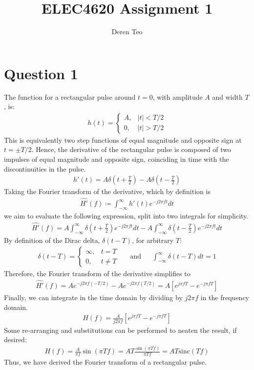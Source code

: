 \documentclass[a4paper, 11pt]{article}
\title{ELEC4620 Assignment 1}
\author{Deren Teo}
\begin{document}
\maketitle

\section*{Question 1}

The function for a rectangular pulse around $t=0$, with amplitude $A$ and width
$T$, is:
\begin{align*}
    h(t) = \begin{cases}
        A, & |t| < T/2 \\
        0, & |t| > T/2
    \end{cases}
\end{align*}
This is equivalently two step functions of equal magnitude and opposite sign at
$t=\pm T/2$. Hence, the derivative of the rectangular pulse is composed of two
impulses of equal magnitude and opposite sign, coinciding in time with the
discontinuities in the pulse.
\begin{align*}
    h'(t) = A \delta(t+\frac{T}{2}) - A \delta(t-\frac{T}{2})
\end{align*}
Taking the Fourier transform of the derivative, which by definition is
\begin{align*}
    \widehat{H'}(f) \coloneqq \int_{-\infty}^{\infty} h'(t) e^{-j2\pi ft} dt
\end{align*}
we aim to evaluate the following expression, split into two integrals for
simplicity.
\begin{align*}
    \widehat{H'}(f) = A \int_{-\infty}^{\infty} \delta(t + \frac{T}{2}) e^{-j2\pi ft} dt -
            A \int_{-\infty}^{\infty} \delta(t - \frac{T}{2}) e^{-j2\pi ft} dt
\end{align*}
By definition of the Dirac delta, $\delta(t-T)$, for arbitrary $T$:
\begin{align*}
    \delta(t-T) = \begin{cases}
        \infty, & t = T \\
        0,      & t \neq T
    \end{cases}
    && \text{and} &&
    \int_{-\infty}^{\infty} \delta(t-T) dt = 1
\end{align*}
Therefore, the Fourier transform of the derivative simplifies to
\begin{align*}
    \widehat{H'}(f) = Ae^{-j2\pi f(-T/2)} - Ae^{-j2\pi f(T/2)}
          = A \left[ e^{j\pi fT} - e^{-j\pi fT}\right]
\end{align*}
Finally, we can integrate in the time domain by dividing by $j2\pi f$ in the
frequency domain.
\begin{align*}
    H(f) = \frac{A}{j2\pi f} \left[ e^{j\pi fT} - e^{-j\pi fT}\right]
\end{align*}
Some re-arranging and substitutions can be performed to neaten the result, if desired:
\begin{align*}
    H(f) = \frac{A}{\pi f}\sin(\pi Tf)
         = AT\frac{\sin(\pi Tf)}{\pi Tf}
         = AT\text{sinc}(Tf)
\end{align*}
Thus, we have derived the Fourier transform of a rectangular pulse.
\end{document}
